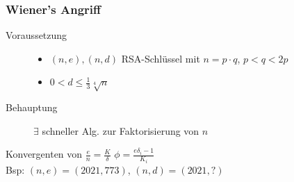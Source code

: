 \documentclass[10pt]{article}
\newcommand{\Oneover}[1]{\frac{1}{#1}} %
\begin{document}
\subsubsection{Wiener's Angriff}
\begin{description}
 \item [Voraussetzung] \hfill
    \begin{itemize}
      \item $(n,e),(n,d)$ RSA-Schlüssel mit $n=p\cdot q$, $p<q<2p$
      \item $0<d\leqslant\Oneover{3}\sqrt[4]{n}$
    \end{itemize}
 \item [Behauptung] $\exists$ schneller Alg. zur Faktorisierung von $n$
\end{description}
Konvergenten von $\frac{e}{n} = \frac{K}{\delta}$ $\phi = \frac{e \delta_{i}-1}{K_i}$\\
Bsp: $(n,e) = (2021, 773)$, $(n,d) = (2021, ?)$\\
\end{document}
